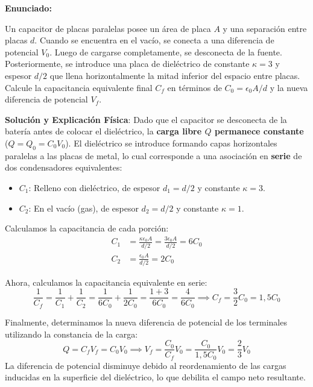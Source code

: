 \documentclass[12pt, a4paper]{article}
\newenvironment{ejercicio}[1]{
  \begin{mdframed}[
    linecolor=ejercicioline, linewidth=1.5pt, roundcorner=8pt, backgroundcolor=ejercicioback,
    skipabove=14pt, skipbelow=14pt,
    frametitle={\color{white}\bfseries Ejercicio Modelo: #1},
    frametitlebackgroundcolor=ejercicioline,
    frametitleaboveskip=6pt, frametitlebelowskip=6pt
  ]
  \textbf{Enunciado:}\par\medskip
}{
  \end{mdframed}
}
\begin{document}
\begin{ejercicio}{Capacitor con Dieléctrico Parcial}
Un capacitor de placas paralelas posee un área de placa $A$ y una separación entre placas $d$. Cuando se encuentra en el vacío, se conecta a una diferencia de potencial $V_0$. Luego de cargarse completamente, se desconecta de la fuente. Posteriormente, se introduce una placa de dieléctrico de constante $\kappa = 3$ y espesor $d/2$ que llena horizontalmente la mitad inferior del espacio entre placas. 
Calcule la capacitancia equivalente final $C_f$ en términos de $C_0 = \epsilon_0 A / d$ y la nueva diferencia de potencial $V_f$.

\medskip
\textbf{Solución y Explicación Física}:
Dado que el capacitor se desconecta de la batería antes de colocar el dieléctrico, la \textbf{carga libre $Q$ permanece constante} ($Q = Q_0 = C_0 V_0$). El dieléctrico se introduce formando capas horizontales paralelas a las placas de metal, lo cual corresponde a una asociación en \textbf{serie} de dos condensadores equivalentes:
\begin{itemize}
    \item $C_1$: Relleno con dieléctrico, de espesor $d_1 = d/2$ y constante $\kappa = 3$.
    \item $C_2$: En el vacío (gas), de espesor $d_2 = d/2$ y constante $\kappa = 1$.
\end{itemize}

Calculamos la capacitancia de cada porción:
\begin{align*}
    C_1 &= \frac{\kappa \epsilon_0 A}{d/2} = \frac{3 \epsilon_0 A}{d/2} = 6 C_0 \\
    C_2 &= \frac{\epsilon_0 A}{d/2} = 2 C_0
\end{align*}

Ahora, calculamos la capacitancia equivalente en serie:
\[
\frac{1}{C_f} = \frac{1}{C_1} + \frac{1}{C_2} = \frac{1}{6 C_0} + \frac{1}{2 C_0} = \frac{1 + 3}{6 C_0} = \frac{4}{6 C_0} \implies C_f = \frac{3}{2} C_0 = 1{,}5 C_0
\]

Finalmente, determinamos la nueva diferencia de potencial de los terminales utilizando la constancia de la carga:
\[
Q = C_f V_f = C_0 V_0 \implies V_f = \frac{C_0}{C_f} V_0 = \frac{C_0}{1{,}5 C_0} V_0 = \frac{2}{3} V_0
\]
La diferencia de potencial disminuye debido al reordenamiento de las cargas inducidas en la superficie del dieléctrico, lo que debilita el campo neto resultante.
\end{ejercicio}

\newpage
\end{document}
